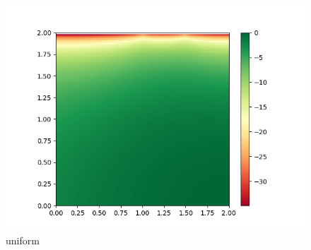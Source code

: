 \documentclass[english]{scrartcl}
\begin{document}
\begin{figure}[H]
	\includegraphics[width=\linewidth]{lighthouse/2d/unif_n=16}
	\caption{uniform} 
	\endminipage \hfill
\end{figure}
\end{document}

